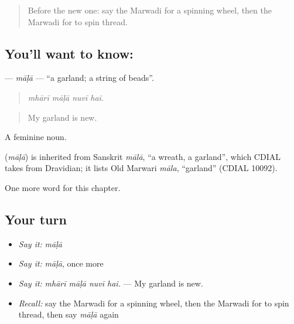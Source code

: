 \label{lesson:MW-C282-mala}



\begin{quote}
Before the new one: say the Marwadi for a spinning wheel, then the Marwadi for to spin thread.
\end{quote}

\subsection*{You'll want to know: }
\textbf{} — \emph{māḷā} — \textquotedblleft{}a garland; a string of beads\textquotedblright{}.

\begin{quote}
   
\end{quote}

\begin{quote}
\emph{mhārī māḷā nuvī hai.}
\end{quote}

\begin{quote}
My garland is new.
\end{quote}

A feminine noun.

\begin{cousinweb}
\textbf{} (\emph{māḷā}) is inherited from Sanskrit \emph{mālā}, \textquotedblleft{}a wreath, a garland\textquotedblright{}, which CDIAL takes from Dravidian; it lists Old Marwari \emph{māla}, \textquotedblleft{}garland\textquotedblright{} (CDIAL 10092).
\end{cousinweb}

\begin{grammarlens}[title={What you've built}]
One more word for this chapter.
\end{grammarlens}

\subsection*{Your turn}
\begin{itemize}
\raggedright
  \item \emph{Say it:} \emph{māḷā}
  \item \emph{Say it:} \emph{māḷā}, once more
  \item \emph{Say it:} \emph{mhārī māḷā nuvī hai.} — My garland is new.
  \item \emph{Recall:} say the Marwadi for a spinning wheel, then the Marwadi for to spin thread, then say \emph{māḷā} again
\end{itemize}

